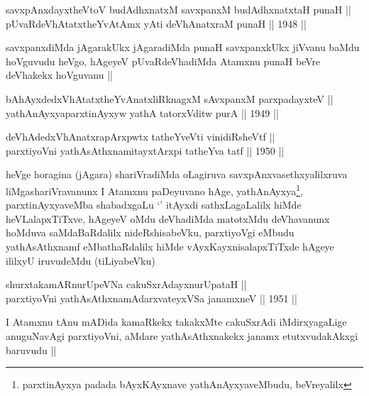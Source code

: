 \begin{shl}
savxpAnxdayxtheVtoV budAdhxnatxM savxpanxM budAdhxnatxtaH punaH || \\
pUvaRdeVhAtatxtheYvA\s \s tAmx yAti deVhAnatxraM punaH ||  1948 ||  
\end{shl}

\begin{artha}
savxpanxdiMda jAgarakUkx jAgaradiMda punaH savxpanxkUkx jiVvanu baMdu
hoVguvudu heVgo, hAgeyeV pUvaRdeVhadiMda Atamxnu punaH beVre deVhakekx
hoVguvanu ||
\end{artha}


\begin{shl}
bAhAyxdedxVhAtatxtheYvAnatxliRknagxM sAvxpanxM parxpadayxteV || \\
yathAnAyxyaparxtinAyxyw yathA tatorxVditw purA ||  1949 ||  
\end{shl}
				
\begin{shl}
deVhAdedxVhAnatxrapArxpwtx tatheYveVti vinidiRsheVtf ||  \\
parxtiyoVni yathAsAthxnamitayxtArxpi tatheYva tatf ||  1950 ||  
\end{shl}

\begin{artha}
heVge horagina (jAgara) shariVradiMda oLagiruva
savxpAnxvasethxyalilxruva liMgashariVravanunx I Atamxnu paDeyuvano
hAge, yathAnAyxya\footnote[1]{parxtinAyxya padada bAyxKAyxnave
  yathAnAyxyaveMbudu, beVreyalilx}, parxtinAyxyaveMba shabadxgaLu
`\stext' itAyxdi sathxLagaLalilx hiMde heVLalapxTiTxve, hAgeyeV oMdu
deVhadiMda matotxMdu deVhavanunx hoMduva saMdaBaRdalilx
nideRshisabeVku, parxtiyoVgi eMbudu yathAsAthxnamf eMbathaRdalilx
hiMde vAyxKayxnisalapxTiTxde hAgeye ililxyU iruvudeMdu (tiLiyabeVku)
\end{artha}


\begin{shl}
shurxtakamARnurUpeVNa cakuSxrAdayxnurUpataH || \\
parxtiyoVni yathAsAthxnamAdarxvateyxVSa janamxneV ||  1951 ||  
\end{shl}

\begin{artha}
I Atamxnu tAnu mADida kamaRkekx takakxMte cakuSxrAdi iMdirxyagaLige
anuguNavAgi parxtiyoVni, aMdare yathAsAthxnakekx janamx
etutxvudakAkxgi baruvudu ||
\end{artha}

